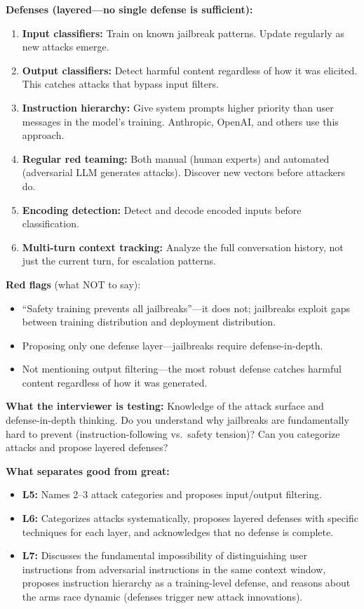 \begin{interviewq}
\textbf{Defenses (layered---no single defense is sufficient):}
\begin{enumerate}
    \item \textbf{Input classifiers:} Train on known jailbreak patterns. Update regularly as new attacks emerge.
    \item \textbf{Output classifiers:} Detect harmful content regardless of how it was elicited. This catches attacks that bypass input filters.
    \item \textbf{Instruction hierarchy:} Give system prompts higher priority than user messages in the model's training. Anthropic, OpenAI, and others use this approach.
    \item \textbf{Regular red teaming:} Both manual (human experts) and automated (adversarial LLM generates attacks). Discover new vectors before attackers do.
    \item \textbf{Encoding detection:} Detect and decode encoded inputs before classification.
    \item \textbf{Multi-turn context tracking:} Analyze the full conversation history, not just the current turn, for escalation patterns.
\end{enumerate}

\textbf{Red flags} (what NOT to say):
\begin{itemize}
    \item ``Safety training prevents all jailbreaks''---it does not; jailbreaks exploit gaps between training distribution and deployment distribution.
    \item Proposing only one defense layer---jailbreaks require defense-in-depth.
    \item Not mentioning output filtering---the most robust defense catches harmful content regardless of how it was generated.
\end{itemize}

\textbf{What the interviewer is testing:} Knowledge of the attack surface and defense-in-depth thinking. Do you understand why jailbreaks are fundamentally hard to prevent (instruction-following vs.\ safety tension)? Can you categorize attacks and propose layered defenses?

\textbf{What separates good from great:}
\begin{itemize}
    \item \textbf{L5:} Names 2--3 attack categories and proposes input/output filtering.
    \item \textbf{L6:} Categorizes attacks systematically, proposes layered defenses with specific techniques for each layer, and acknowledges that no defense is complete.
    \item \textbf{L7:} Discusses the fundamental impossibility of distinguishing user instructions from adversarial instructions in the same context window, proposes instruction hierarchy as a training-level defense, and reasons about the arms race dynamic (defenses trigger new attack innovations).
\end{itemize}


\end{interviewq}
